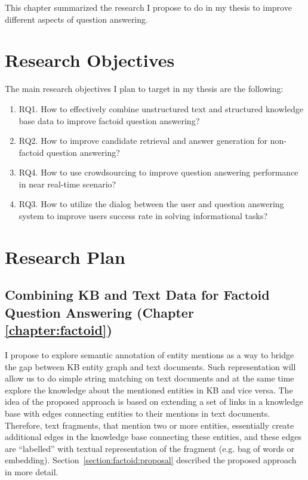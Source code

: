 %

\label{chapter:proposal}

\noindent

This chapter summarized the research I propose to do in my thesis to improve different aspects of question answering.

\section{Research Objectives}
\label{section:proposal:objectives}

The main research objectives I plan to target in my thesis are the following:

\begin{enumerate}
\item RQ1. How to effectively combine unstructured text and structured knowledge base data to improve factoid question answering?
\item RQ2. How to improve candidate retrieval and answer generation for non-factoid question answering?
\item RQ4. How to use crowdsourcing to improve question answering performance in near real-time scenario?
\item RQ3. How to utilize the dialog between the user and question answering system to improve users success rate in solving informational tasks?
\end{enumerate}

\section{Research Plan}
\label{section:proposal:plan}

\subsection{Combining KB and Text Data for Factoid Question Answering (Chapter \ref{chapter:factoid})}
\label{section:proposal:plan:factoid}

I propose to explore semantic annotation of entity mentions as a way to bridge the gap between KB entity graph and text documents.
Such representation will allow us to do simple string matching on text documents and at the same time explore the knowledge about the mentioned entities in KB and vice versa.
The idea of the proposed approach is based on extending a set of links in a knowledge base with edges connecting entities to their mentions in text documents.
Therefore, text fragments, that mention two or more entities, essentially create additional edges in the knowledge base connecting these entities, and these edges are ``labelled'' with textual representation of the fragment (e.g. bag of words or embedding).
Section~\ref{section:factoid:proposal} described the proposed approach in more detail.

